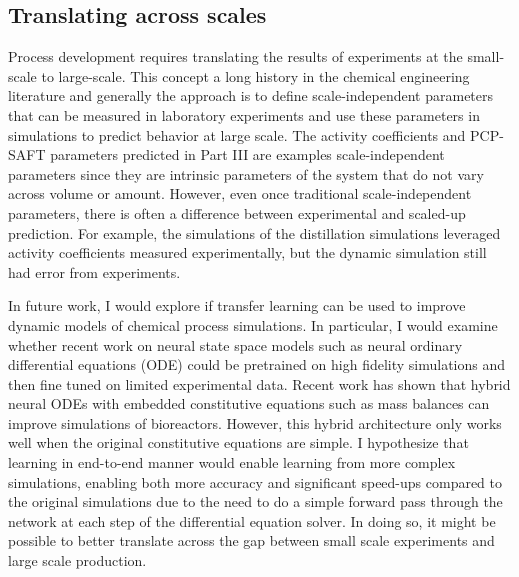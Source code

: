 \subsection{Translating across scales}

Process development requires translating the results of experiments at the small-scale to large-scale. This concept  a long history in the chemical engineering literature and generally the approach is to define scale-independent parameters that can be measured in laboratory experiments and use these parameters in simulations to predict behavior at large scale. The activity coefficients and PCP-SAFT parameters predicted in Part III are examples scale-independent parameters since they are intrinsic parameters of the system that do not vary across volume or amount. However, even once traditional  scale-independent parameters, there is often a difference between experimental and scaled-up prediction. For example, the simulations of the distillation simulations leveraged activity coefficients measured experimentally, but the dynamic simulation still had error from experiments. 

In future work, I would explore if transfer learning can be used to improve dynamic models of chemical process simulations. In particular, I would examine whether recent work on neural state space models such as neural ordinary differential equations (ODE) could be pretrained on high fidelity simulations and then fine tuned on limited experimental data. Recent work has shown that hybrid neural ODEs with embedded constitutive equations such as mass balances can improve simulations of bioreactors. However, this hybrid architecture only works well when the original constitutive equations are simple. I hypothesize that learning in end-to-end manner would enable learning from more complex simulations, enabling both more accuracy and significant speed-ups compared to the original simulations due to the need to do a simple forward pass through the network at each step of the differential equation solver.  In doing so, it might be possible to better translate across the gap between small scale experiments and large scale production.


